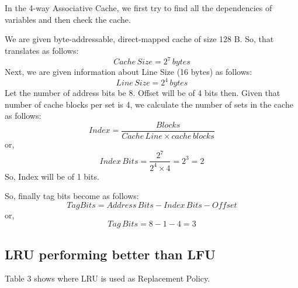 \documentclass[12pt]{article}
\begin{document}
\section{}

In the 4-way Associative Cache, we first try to find all the dependencies of variables and then check the cache.

We are given byte-addressable, direct-mapped cache of size 128 B. So, that translates as follows:
\begin{equation*}
    Cache \, Size = 2^{7} \, bytes
\end{equation*}
Next, we are given information about Line Size (16 bytes) as follows:
\begin{equation*}
    Line \, Size = 2^4 \, bytes
\end{equation*}
Let the number of address bits be 8. Offset will be of 4 bits then. Given that number of cache blocks per set is 4, we calculate the number of sets in the cache as follows:
\begin{equation*}
    Index = \frac{Blocks}{Cache \, Line \times cache \, blocks}
\end{equation*}
or,
\begin{equation*}
    Index \, Bits = \frac{2^{7}}{2^4 \times 4} = 2^3 = 2
\end{equation*}
So, Index will be of 1 bits.
	
So, finally tag bits become as follows:
\begin{equation*}
    Tag Bits = Address \, Bits - Index \, Bits - Offset
\end{equation*}
or,
\begin{equation*}
    Tag \, Bits = 8 - 1 - 4 = 3
\end{equation*}

\subsection{LRU performing better than LFU}
Table 3 shows where LRU is used as Replacement Policy.
\end{document}
